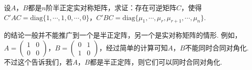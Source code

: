 \documentclass[../../main.tex]{subfiles}
\begin{document}
\begin{proposition}\label{proposition:例9.82}
设\(A\)，\(B\)都是\(n\)阶半正定实对称矩阵，求证：存在可逆矩阵\(C\)，使得
\(C'AC = \mathrm{diag}\{1,\cdots,1,0,\cdots,0\}\)，\(C'BC = \mathrm{diag}\{\mu_1,\cdots,\mu_r,\mu_{r + 1},\cdots,\mu_n\}\).
\end{proposition}
\begin{remark}
的结论一般并不能推广到一个是半正定阵，另一个是实对称矩阵的情形. 例如，\(A=\begin{pmatrix}1&0\\0&0\end{pmatrix}\)，\(B=\begin{pmatrix}0&1\\1&0\end{pmatrix}\)，经过简单的计算可知\(A\)，\(B\)不能同时合同对角化. 不过这个告诉我们，若\(A\)，\(B\)都是半正定阵，则它们可以同时合同对角化.
\end{remark}
\end{document}
